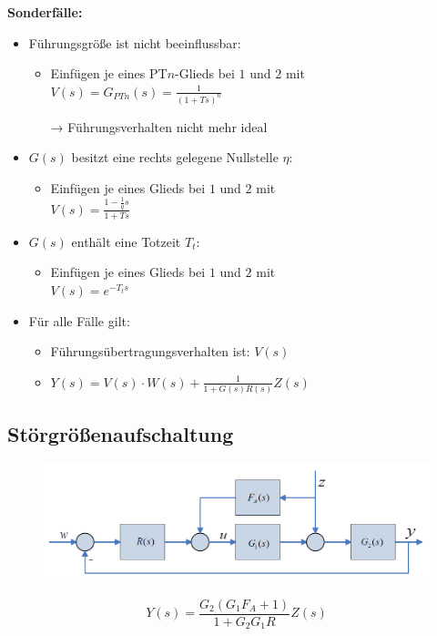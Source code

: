 \documentclass[10pt,a4paper]{article}
\begin{document}
\textbf{Sonderfälle:}
\begin{itemize}
	\item Führungsgröße ist nicht beeinflussbar:
	\begin{itemize}
		\item Einfügen je eines PT$n$-Glieds bei $1$ und $2$ mit \\
		$V(s) = G_{PTn}(s) = \frac{1}{(1 + Ts)^n}$
		\item[→] Führungsverhalten nicht mehr ideal
	\end{itemize}
	\item $G(s)$ besitzt eine rechts gelegene Nullstelle $\eta$:
	\begin{itemize}
		\item Einfügen je eines Glieds bei $1$ und $2$ mit \\
		$V(s) = \frac{1 - \frac 1 q s}{1 + Ts}$
	\end{itemize}
	\item  $G(s)$ enthält eine Totzeit $T_t$:
	\begin{itemize}
		\item Einfügen je eines Glieds bei $1$ und $2$ mit \\
		$V(s) = e^{-T_ts}$
	\end{itemize}
	\item Für alle Fälle gilt:
	\begin{itemize}
		\item Führungsübertragungsverhalten ist: $V(s)$
		\item $Y(s) = V(s) ⋅ W(s) + \frac{1}{1 + G(s) R(s)} Z(s)$
	\end{itemize}
	
\end{itemize}

\subsection{Störgrößenaufschaltung}
\begin{figure}[H]
	\includegraphics[width=0.7\columnwidth]{imgs/abb7_4.png}
\end{figure}

$$
	Y(s) = \frac{G_2(G_1 F_A + 1)}{1 + G_2 G_1 R} Z(s)
$$
\end{document}

